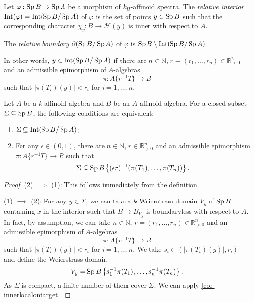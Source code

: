 \begin{definition}
    Let $\varphi:\operatorname{Sp} B\rightarrow \operatorname{Sp} A$ be a morphism of $k_H$-affinoid spectra. The \emph{relative interior} $\operatorname{Int}(\varphi)=\operatorname{Int}(\operatorname{Sp} B/\operatorname{Sp} A)$ of $\varphi$ is the set of points $y\in \operatorname{Sp} B$ such that the corresponding character $\chi_y:B\rightarrow \mathscr{H}(y)$ is inner with respect to $A$. 

    The \emph{relative boundary} $\partial(\operatorname{Sp} B/\operatorname{Sp} A)$ of $\varphi$ is $\operatorname{Sp} B\setminus \operatorname{Int}(\operatorname{Sp} B/\operatorname{Sp} A)$.
\end{definition}
In other words, $y\in \operatorname{Int}(\operatorname{Sp} B/\operatorname{Sp} A)$ if there are $n\in \mathbb{N}$, $r=(r_1,\ldots,r_n)\in \mathbb{R}^n_{>0}$ and an admissible epimorphism of $A$-algebras
\[
    \pi: A\{r^{-1}T\}\rightarrow B    
\] 
such that $|\pi(T_i)(y)|<r_i$ for $i=1,\ldots,n$.


\begin{proposition}\label{prop-closedsetininteriorcri}
    Let $A$ be a $k$-affinoid algebra and $B$ be an $A$-affinoid algebra. For a closed subset $\Sigma\subseteq \operatorname{Sp} B$, the following conditions are equivalent:
    \begin{enumerate}
        \item $\Sigma\subseteq \operatorname{Int}(\operatorname{Sp} B/\operatorname{Sp} A)$;
        \item For any $\epsilon\in (0,1)$, there are $n\in \mathbb{N}$, $r\in \mathbb{R}^n_{>0}$ and an admissible epimorphism $\pi: A\{r^{-1}T\}\rightarrow B$ such that 
        \[
            \Sigma\subseteq \operatorname{Sp} B\left\{(\epsilon r)^{-1}(\pi(T_1),\ldots,\pi(T_n))\right\}.    
        \]
    \end{enumerate}
\end{proposition}
\begin{proof}
    (2) $\implies$ (1): This follows immediately from the definition.

    (1) $\implies$ (2): For any $y\in \Sigma$, we can take a $k$-Weierstrass domain $V_y$ of $\operatorname{Sp} B$ containing $x$ in the interior such that $B\rightarrow B_{V_y}$ is boundaryless with respect to $A$. In fact, by assumption, we can take $n\in \mathbb{N}$, $r=(r_1,\ldots,r_n)\in \mathbb{R}^n_{>0}$ and an admissible epimorphism of $A$-algebras
    \[
        \pi:A\{r^{-1}T\}\rightarrow B  
    \]
    such that $|\pi(T_i)(y)|<r_i$ for $i=1,\ldots,n$.  We
    take $s_i\in (|\pi(T_i)(y)|,r_i)$ and
    define the Weierstrass domain 
    \[
        V_y=\operatorname{Sp} B\left\{s_1^{-1}\pi(T_1),\ldots,s_n^{-1}\pi(T_n)\right\}.
    \]
    As $\Sigma$ is compact, a finite number of them cover $\Sigma$. We can apply \cref{cor-innerlocalontarget}.
\end{proof}


